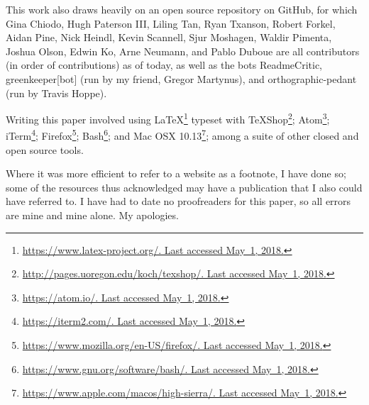 \documentclass[12pt,a4paper]{article}
\begin{document}
This work also draws heavily on an open source repository on GitHub, for which Gina Chiodo, Hugh Paterson III, Liling Tan, Ryan Txanson, Robert Forkel, Aidan Pine, Nick Heindl, Kevin Scannell, Sjur Moshagen, Waldir Pimenta, Joshua Olson, Edwin Ko, Arne Neumann, and Pablo Duboue are all contributors (in order of contributions) as of today, as well as the bots ReadmeCritic, greenkeeper[bot] (run by my friend, Gregor Martynus), and orthographic-pedant (run by Travis Hoppe).

Writing this paper involved using LaTeX\footnote{\href{https://www.latex-project.org/}{https://www.latex-project.org/. Last accessed May~1, 2018.}} typeset with TeXShop\footnote{\href{http://pages.uoregon.edu/koch/texshop/}{http://pages.uoregon.edu/koch/texshop/. Last accessed May~1, 2018.}}; Atom\footnote{\href{https://atom.io/}{https://atom.io/. Last accessed May~1, 2018.}}; iTerm\footnote{\href{https://iterm2.com/}{https://iterm2.com/. Last accessed May~1, 2018.}}; Firefox\footnote{\href{https://www.mozilla.org/en-US/firefox/}{https://www.mozilla.org/en-US/firefox/. Last accessed May~1, 2018.}}; Bash\footnote{\href{https://www.gnu.org/software/bash/}{https://www.gnu.org/software/bash/. Last accessed May~1, 2018.}}; and Mac OSX 10.13\footnote{\href{https://www.apple.com/macos/high-sierra/}{https://www.apple.com/macos/high-sierra/. Last accessed May~1, 2018.}}; among a suite of other closed and open source tools.

Where it was more efficient to refer to a website as a footnote, I have done so; some of the resources thus acknowledged may have a publication that I also could have referred to. I have had to date no proofreaders for this paper, so all errors are mine and mine alone. My apologies.

\newpage

%
\tableofcontents
\thispagestyle{empty}

\newpage
\thispagestyle{empty}
\setcounter{page}{0}
\listoffigures
\setcounter{page}{0}
\listoftables
\thispagestyle{empty}
\newpage

\setcounter{page}{1}

\end{document}
